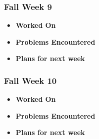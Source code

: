 \documentclass[compsoc,draftclsnofoot,onecolumn,10pt]{IEEEtran}
\begin{document}
\subsubsection{Fall Week 9}
\begin{itemize}
    \item {\textbf{Worked On}}
    \begin{itemize}

    \end{itemize}

    \item {\textbf{Problems Encountered}}
    \begin{itemize}

    \end{itemize}

    \item{\textbf{Plans for next week}}
    \begin{itemize}

    \end{itemize}

\end{itemize}

\subsubsection{Fall Week 10}
\begin{itemize}
    \item {\textbf{Worked On}}
    \begin{itemize}

    \end{itemize}

    \item {\textbf{Problems Encountered}}
    \begin{itemize}

    \end{itemize}

    \item{\textbf{Plans for next week}}
    \begin{itemize}

    \end{itemize}

\end{itemize}
\end{document}
